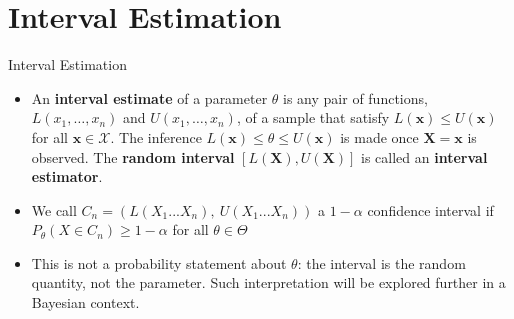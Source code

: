 \documentclass{beamer}
\begin{document}
\section{Interval Estimation}

\begin{frame}{Interval Estimation}
\begin{itemize}
\item An \textbf{interval estimate} of a parameter $\theta$ is any pair of functions, $L(x_1,\ldots,x_n)$ and $U(x_1,\ldots,x_n)$, of a sample that satisfy $L(\mathbf{x}) \leq U(\mathbf{x})$ for all $\mathbf{x} \in \mathcal{X}$. The inference $L(\mathbf{x}) \leq \theta \leq U(\mathbf{x})$ is made once $\mathbf{X} = \mathbf{x}$ is observed. The \textbf{random interval} $[L(\mathbf{X}),U(\mathbf{X})]$ is called an \textbf{interval estimator}.
\item We call $C_n = (L(X_1...X_n), \ U(X_1...X_n))$ a $1 - \alpha$ confidence interval if $P_\theta(X \in C_n) \geq 1 - \alpha$ for all $\theta \in \Theta$
\item This is not a probability statement about $\theta$: the interval is the random quantity, not the parameter. Such interpretation will be explored further in a Bayesian context. 
\end{itemize}
\end{frame}
\end{document}
